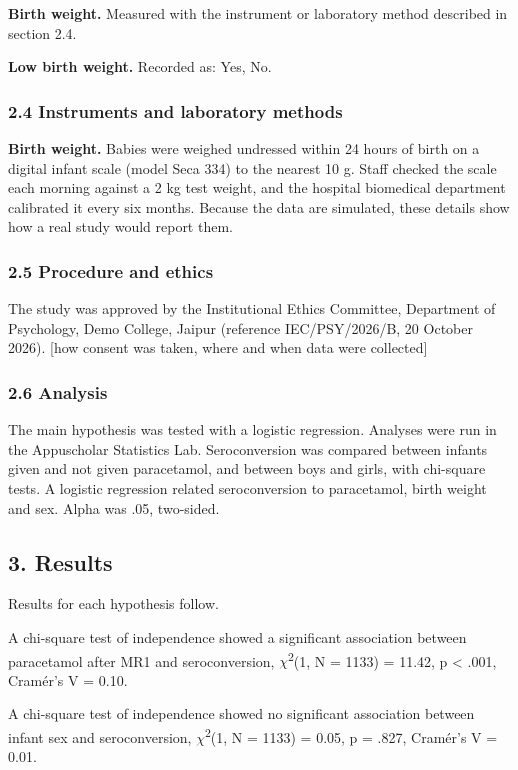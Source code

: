 \documentclass[12pt]{article}
\begin{document}
\textbf{Birth weight.} Measured with the instrument or laboratory method described in section 2.4.

\textbf{Low birth weight.} Recorded as: Yes, No.

\subsubsection{2.4 Instruments and laboratory methods}

\textbf{Birth weight.} Babies were weighed undressed within 24 hours of birth on a digital infant scale (model Seca 334) to the nearest 10 g. Staff checked the scale each morning against a 2 kg test weight, and the hospital biomedical department calibrated it every six months. Because the data are simulated, these details show how a real study would report them.

\subsubsection{2.5 Procedure and ethics}

The study was approved by the Institutional Ethics Committee, Department of Psychology, Demo College, Jaipur (reference IEC/PSY/2026/B, 20 October 2026). [how consent was taken, where and when data were collected]

\subsubsection{2.6 Analysis}

The main hypothesis was tested with a logistic regression. Analyses were run in the Appuscholar Statistics Lab. Seroconversion was compared between infants given and not given paracetamol, and between boys and girls, with chi-square tests. A logistic regression related seroconversion to paracetamol, birth weight and sex. Alpha was .05, two-sided.

\subsection{3. Results}

Results for each hypothesis follow.

A chi-square test of independence showed a significant association between paracetamol after MR1 and seroconversion, \ensuremath{\chi}\textsuperscript{2}(1, N = 1133) = 11.42, p < .001, Cramér's V = 0.10.

A chi-square test of independence showed no significant association between infant sex and seroconversion, \ensuremath{\chi}\textsuperscript{2}(1, N = 1133) = 0.05, p = .827, Cramér's V = 0.01.
\end{document}
